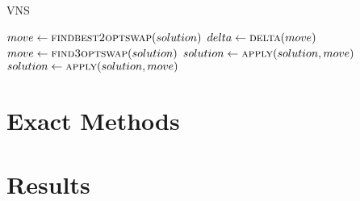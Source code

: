 \documentclass{article}
\begin{document}
\begin{algorithm}[h]
\caption{VNS}
\label{alg:vns}
\begin{algorithmic}
    \State{}

        \State $move \gets \Call{findbest2optswap}{solution}$
        \State $delta \gets \Call{delta}{move}$
				\State $move \gets \Call{find3optswap}{solution}$
		        \State $solution \gets \Call{apply}{solution, move}$
			\EndFor
        \EndIf
        \State $solution \gets \Call{apply}{solution, move}$
    \EndWhile

  \EndProcedure

\end{algorithmic}
\end{algorithm}

\section{Exact Methods}
\section{Results}
\end{document}
